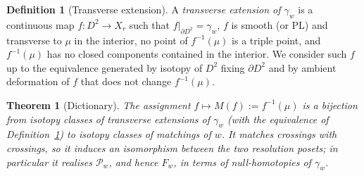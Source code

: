 \documentclass[11pt]{article}
\newtheorem{theorem}{Theorem}
\theoremstyle{definition}
\newtheorem{definition}{Definition}
\theoremstyle{remark}
\newcommand{\bdy}{\partial}
\newcommand{\defeq}{\mathrel{:=}}
\newcommand{\rose}{X_r}
\begin{document}
\begin{definition}[Transverse extension]\label{def:transmap}
A \emph{transverse extension of $\gamma_w$} is a continuous map $f\colon
D^2\to\rose$ such that $f|_{\bdy D^2}=\gamma_w$, $f$ is smooth (or PL) and
transverse to $\mu$ in the interior, no point of $f^{-1}(\mu)$ is a triple point,
and $f^{-1}(\mu)$ has no closed components contained in the interior. We consider
such $f$ up to the equivalence generated by isotopy of $D^2$ fixing $\bdy D^2$
and by ambient deformation of $f$ that does not change $f^{-1}(\mu)$.
\end{definition}

\begin{theorem}[Dictionary]\label{thm:dict}
The assignment $f\mapsto M(f)\defeq f^{-1}(\mu)$ is a bijection from isotopy
classes of transverse extensions of $\gamma_w$ \emph{(with the equivalence of
Definition~\ref{def:transmap})} to isotopy classes of matchings of $w$. It
matches crossings with crossings, so it induces an isomorphism between the two
resolution posets; in particular it realises $\mathcal P_w$, and hence $F_w$, in
terms of null-homotopies of $\gamma_w$.
\end{theorem}
\end{document}
